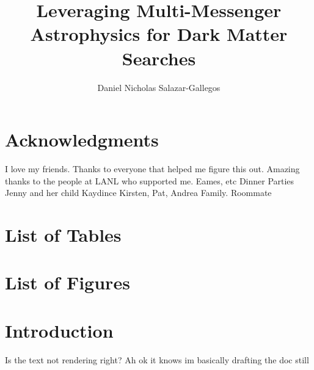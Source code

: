 \documentclass[a4paper, 12pt]{article}
\title{Leveraging Multi-Messenger Astrophysics for Dark Matter Searches}
\author{Daniel Nicholas Salazar-Gallegos}
\begin{document}
\maketitle

\pagebreak


\pagebreak

\section{Acknowledgments}
I love my friends.
Thanks to everyone that helped me figure this out.
Amazing thanks to the people at LANL who supported me.
Eames, etc
Dinner Parties
Jenny and her child Kaydince
Kirsten, Pat, Andrea
Family.
Roommate

\pagebreak

\tableofcontents

\pagebreak

\section{List of Tables\label{sec:lo_Tbl}}


\section{List of Figures\label{sec:lo_Fig}}


\section{Introduction\label{sec:intro}}
Is the text not rendering right? Ah ok it knows im basically drafting the doc still
\end{document}
